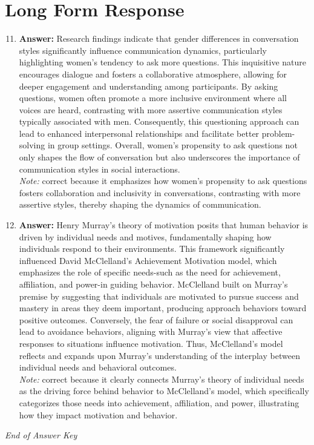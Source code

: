 \documentclass[12pt]{article}
\begin{document}
\section*{Long Form Response}
\begin{enumerate}[label=\arabic*.]
\setcounter{enumi}{10}
\item \textbf{Answer:} Research findings indicate that gender differences in conversation styles significantly influence communication dynamics, particularly highlighting women's tendency to ask more questions. This inquisitive nature encourages dialogue and fosters a collaborative atmosphere, allowing for deeper engagement and understanding among participants. By asking questions, women often promote a more inclusive environment where all voices are heard, contrasting with more assertive communication styles typically associated with men. Consequently, this questioning approach can lead to enhanced interpersonal relationships and facilitate better problem-solving in group settings. Overall, women's propensity to ask questions not only shapes the flow of conversation but also underscores the importance of communication styles in social interactions.
\\ \textit{Note:} correct because it emphasizes how women's propensity to ask questions fosters collaboration and inclusivity in conversations, contrasting with more assertive styles, thereby shaping the dynamics of communication.
\item \textbf{Answer:} Henry Murray's theory of motivation posits that human behavior is driven by individual needs and motives, fundamentally shaping how individuals respond to their environments. This framework significantly influenced David McClelland's Achievement Motivation model, which emphasizes the role of specific needs-such as the need for achievement, affiliation, and power-in guiding behavior. McClelland built on Murray's premise by suggesting that individuals are motivated to pursue success and mastery in areas they deem important, producing approach behaviors toward positive outcomes. Conversely, the fear of failure or social disapproval can lead to avoidance behaviors, aligning with Murray's view that affective responses to situations influence motivation. Thus, McClelland's model reflects and expands upon Murray's understanding of the interplay between individual needs and behavioral outcomes.
\\ \textit{Note:} correct because it clearly connects Murray's theory of individual needs as the driving force behind behavior to McClelland's model, which specifically categorizes those needs into achievement, affiliation, and power, illustrating how they impact motivation and behavior.
\end{enumerate}

\vfill
\noindent\textit{End of Answer Key}
\end{document}
